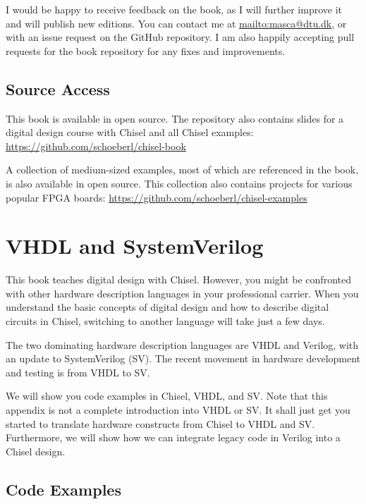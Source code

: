 \documentclass[%
    10pt,
    headinclude, footexclude,
    openright, %
    notitlepage,
    cleardoubleempty,
    headsepline,
    pointlessnumbers,
    bibtotoc, idxtotoc,
    ]{scrbook}
\begin{document}
I would be happy to receive feedback on the book, as I will further
improve it and will publish new editions. You can contact me at
\url{mailto:masca@dtu.dk}, or with an issue request on the GitHub
repository. I am also happily accepting pull requests
for the book repository for any fixes and improvements.

\section*{Source Access}

This book is available in open source.
The repository also contains slides for a digital design course with Chisel and
all Chisel examples: \url{https://github.com/schoeberl/chisel-book}

A collection of medium-sized examples, most of which are referenced
in the book, is also available in open source. This collection
also contains projects for various popular FPGA boards:
\url{https://github.com/schoeberl/chisel-examples}

\appendix

\chapter{VHDL and SystemVerilog}


This book teaches digital design with Chisel.
However, you might be confronted with other hardware
description languages in your professional carrier.
When you understand the basic concepts of digital design
and how to describe digital circuits in Chisel,
switching to another language will take just a few days.

The two dominating hardware description languages are
VHDL and Verilog, with an update to SystemVerilog (SV). The recent movement
in hardware development and testing is from VHDL to SV.

We will show you code examples in Chisel, VHDL, and SV.
Note that this appendix is not a complete introduction into VHDL or SV.
It shall just get you started to translate hardware constructs from Chisel to VHDL and SV.
Furthermore, we will show how we can integrate legacy code in Verilog into a Chisel design.

\section{Code Examples}
\end{document}
